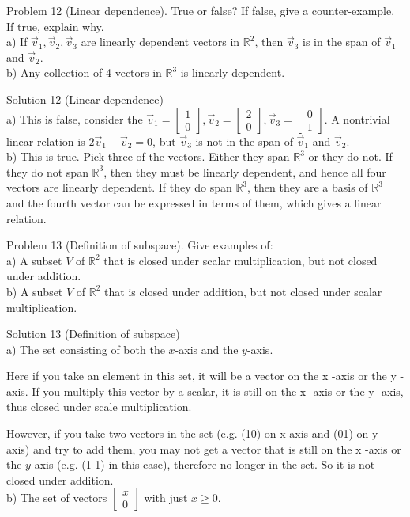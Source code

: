 \documentclass[10pt]{article}
\begin{document}
Problem 12 (Linear dependence). True or false? If false, give a counter-example. If true, explain why.\\
a) If $\vec{v}_{1}, \vec{v}_{2}, \vec{v}_{3}$ are linearly dependent vectors in $\mathbb{R}^{2}$, then $\vec{v}_{3}$ is in the span of $\vec{v}_{1}$ and $\vec{v}_{2}$.\\
b) Any collection of 4 vectors in $\mathbb{R}^{3}$ is linearly dependent.

Solution 12 (Linear dependence)\\
a) This is false, consider the $\vec{v}_{1}=\left[\begin{array}{l}1 \\ 0\end{array}\right], \vec{v}_{2}=\left[\begin{array}{l}2 \\ 0\end{array}\right], \vec{v}_{3}=\left[\begin{array}{l}0 \\ 1\end{array}\right]$. A nontrivial linear relation is $2 \vec{v}_{1}-\vec{v}_{2}=0$, but $\vec{v}_{3}$ is not in the span of $\vec{v}_{1}$ and $\vec{v}_{2}$.\\
b) This is true. Pick three of the vectors. Either they span $\mathbb{R}^{3}$ or they do not. If they do not span $\mathbb{R}^{3}$, then they must be linearly dependent, and hence all four vectors are linearly dependent. If they do span $\mathbb{R}^{3}$, then they are a basis of $\mathbb{R}^{3}$ and the fourth vector can be expressed in terms of them, which gives a linear relation.

Problem 13 (Definition of subspace). Give examples of:\\
a) A subset $V$ of $\mathbb{R}^{2}$ that is closed under scalar multiplication, but not closed under addition.\\
b) A subset $V$ of $\mathbb{R}^{2}$ that is closed under addition, but not closed under scalar multiplication.

Solution 13 (Definition of subspace)\\
a) The set consisting of both the $x$-axis and the $y$-axis.

Here if you take an element in this set, it will be a vector on the x -axis or the y -axis. If you multiply this vector by a scalar, it is still on the x -axis or the y -axis, thus closed under scale multiplication.

However, if you take two vectors in the set (e.g. (10) on x axis and (01) on y axis) and try to add them, you may not get a vector that is still on the x -axis or the $y$-axis (e.g. (1 1) in this case), therefore no longer in the set. So it is not closed under addition.\\
b) The set of vectors $\left[\begin{array}{l}x \\ 0\end{array}\right]$ with just $x \geq 0$.
\end{document}
